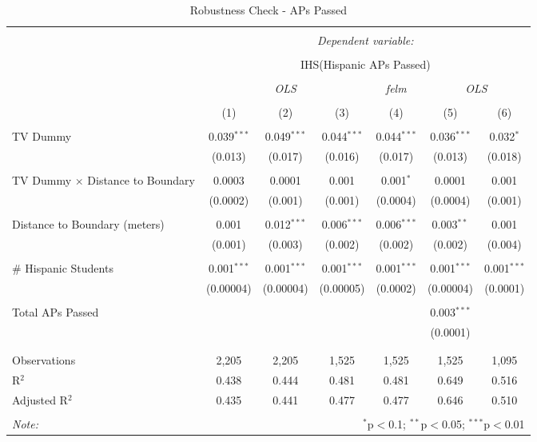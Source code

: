 
\begin{table}[!htbp] \centering 
  \caption{Robustness Check - APs Passed} 
  \label{} 
\begin{tabular}{@{\extracolsep{-2pt}}lcccccc} 
\\[-1.8ex]\hline 
\hline \\[-1.8ex] 
 & \multicolumn{6}{c}{\textit{Dependent variable:}} \\ 
\cline{2-7} 
\\[-1.8ex] & \multicolumn{6}{c}{IHS(Hispanic APs Passed)} \\ 
\\[-1.8ex] & \multicolumn{3}{c}{\textit{OLS}} & \textit{felm} & \multicolumn{2}{c}{\textit{OLS}} \\ 
\\[-1.8ex] & (1) & (2) & (3) & (4) & (5) & (6)\\ 
\hline \\[-1.8ex] 
 TV Dummy & 0.039$^{***}$ & 0.049$^{***}$ & 0.044$^{***}$ & 0.044$^{***}$ & 0.036$^{***}$ & 0.032$^{*}$ \\ 
  & (0.013) & (0.017) & (0.016) & (0.017) & (0.013) & (0.018) \\ 
  & & & & & & \\ 
 TV Dummy $\times$ Distance to Boundary & 0.0003 & 0.0001 & 0.001 & 0.001$^{*}$ & 0.0001 & 0.001 \\ 
  & (0.0002) & (0.001) & (0.001) & (0.0004) & (0.0004) & (0.001) \\ 
  & & & & & & \\ 
 Distance to Boundary (meters) & 0.001 & 0.012$^{***}$ & 0.006$^{***}$ & 0.006$^{***}$ & 0.003$^{**}$ & 0.001 \\ 
  & (0.001) & (0.003) & (0.002) & (0.002) & (0.002) & (0.004) \\ 
  & & & & & & \\ 
 \# Hispanic Students & 0.001$^{***}$ & 0.001$^{***}$ & 0.001$^{***}$ & 0.001$^{***}$ & 0.001$^{***}$ & 0.001$^{***}$ \\ 
  & (0.00004) & (0.00004) & (0.00005) & (0.0002) & (0.00004) & (0.0001) \\ 
  & & & & & & \\ 
 Total APs Passed &  &  &  &  & 0.003$^{***}$ &  \\ 
  &  &  &  &  & (0.0001) &  \\ 
  & & & & & & \\ 
\hline \\[-1.8ex] 
Observations & 2,205 & 2,205 & 1,525 & 1,525 & 1,525 & 1,095 \\ 
R$^{2}$ & 0.438 & 0.444 & 0.481 & 0.481 & 0.649 & 0.516 \\ 
Adjusted R$^{2}$ & 0.435 & 0.441 & 0.477 & 0.477 & 0.646 & 0.510 \\ 
\hline 
\hline \\[-1.8ex] 
\textit{Note:}  & \multicolumn{6}{r}{$^{*}$p$<$0.1; $^{**}$p$<$0.05; $^{***}$p$<$0.01} \\ 
\end{tabular} 
\end{table} 
